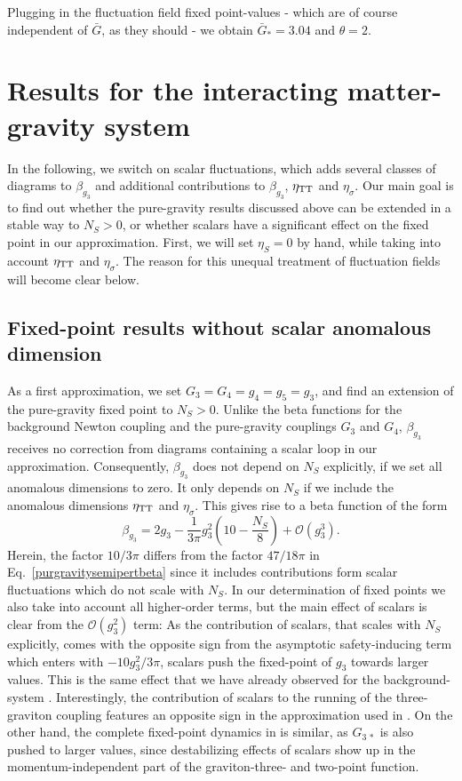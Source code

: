 \documentclass[11pt]{book} %
\newcommand{\be}{\begin{equation}}
\newcommand{\ee}{\end{equation}}
\begin{document}
Plugging in the fluctuation field fixed point-values - which are of course independent of $\bar{G}$, as they should - we obtain $\bar{G}_{\ast} = 3.04$ and $\theta=2$.



\section{Results for the interacting matter-gravity system}
In the following, we switch on scalar fluctuations, which adds several classes of diagrams to $\beta_{g_3}$ and additional contributions to $\beta_{g_3}$, $\eta_{\rm TT}$ and $\eta_{\sigma}$. Our main goal is to find out whether the pure-gravity results discussed above can be extended in a stable way to $N_S>0$, or whether scalars have a significant effect on the fixed point in our approximation. First, we will set $\eta_S=0$ by hand, while taking into account $\eta_{\rm TT}$ and $\eta_{\sigma}$. The reason for this unequal treatment of fluctuation fields will become clear below.


%
\subsection{Fixed-point results without scalar anomalous dimension}
%
As a first approximation, we set $G_3=G_4=g_4=g_5=g_3$, and find an extension of the pure-gravity fixed point to $N_S>0$. Unlike the beta functions for the background Newton coupling and the pure-gravity couplings $G_3$ and $G_4$, $\beta_{g_3}$ receives no correction from diagrams containing a scalar loop  in our approximation. Consequently, $\beta_{g_3}$ does not depend on $N_S$ explicitly, if we set all anomalous dimensions to zero.
It only depends on $N_S$ if we include the anomalous dimensions $\eta_{\rm TT}$ and $\eta_{\sigma}$.
This gives rise to a beta function of the form
\be
\beta_{g_3}= 2g_3 -\frac{1}{3\pi}g_3^2\left(10-\frac{N_S}{8}\right)
+\mathcal{O}(g_3^3).
\label{norma}
\ee
Herein, the factor $10/3\pi$ differs from the  factor $47/18\pi$ in Eq.~\eqref{purgravitysemipertbeta} since it includes contributions form scalar fluctuations which do not scale with $N_S$.
In our determination of fixed points we also take into account all higher-order terms, but the main effect of scalars is clear from the $\mathcal{O}(g_3^2)$ term: As the contribution of scalars, that scales with $N_S$ explicitly, comes with the opposite sign from the asymptotic safety-inducing term which enters with $-10g_3^2/3\pi$, scalars push the fixed-point of $g_3$ towards larger values. This is the same effect that we have already observed for the background-system \cite{Dona:2013qba}. Interestingly, the contribution of scalars to the running of the three-graviton coupling features an opposite sign in the approximation used in \cite{Meibohm:2015twa}. On the other hand, the complete fixed-point dynamics in \cite{Meibohm:2015twa} is similar, as $G_{3\,\ast}$ is also pushed to larger values, since destabilizing effects of scalars show up in the momentum-independent part of the graviton-three- and two-point function.
\end{document}
